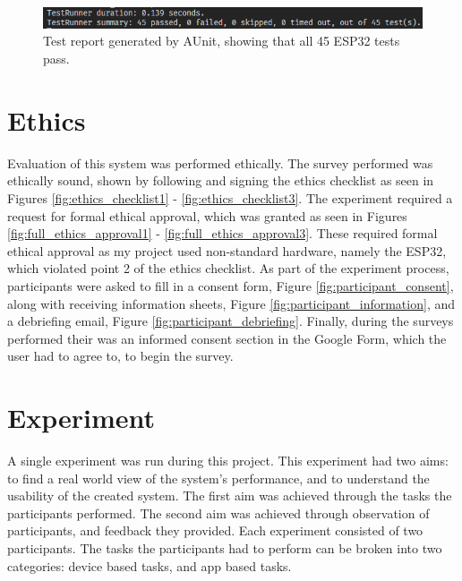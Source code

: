 \documentclass{l4proj}
\begin{document}
\begin{figure}[!htb]
    \centering
    \includegraphics[width=1.0\linewidth]{images/esp32-test-pass.png}

    \caption{ Test report generated by AUnit, showing that all 45 ESP32 tests pass. }

    \label{fig:esp32_tests_pass}
\end{figure}

\section{Ethics}

Evaluation of this system was performed ethically. The survey performed was ethically sound, shown by following and signing the ethics checklist as seen in Figures \ref{fig:ethics_checklist1} - \ref{fig:ethics_checklist3}. The experiment required a request for formal ethical approval, which was granted as seen in Figures \ref{fig:full_ethics_approval1} - \ref{fig:full_ethics_approval3}. These required formal ethical approval as my project used non-standard hardware, namely the ESP32, which violated point 2 of the ethics checklist. As part of the experiment process, participants were asked to fill in a consent form, Figure \ref{fig:participant_consent}, along with receiving information sheets, Figure \ref{fig:participant_information},  and a debriefing email, Figure \ref{fig:participant_debriefing}. Finally, during the surveys performed their was an informed consent section in the Google Form, which the user had to agree to, to begin the survey.

\section{Experiment}

A single experiment was run during this project. This experiment had two aims: to find a real world view of the system's performance, and to understand the usability of the created system. The first aim was achieved through the tasks the participants performed. The second aim was achieved through observation of participants, and feedback they provided. Each experiment consisted of two participants. The tasks the participants had to perform can be broken into two categories: device based tasks, and app based tasks.
\end{document}
